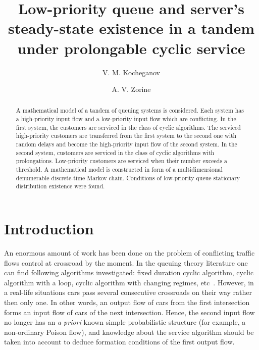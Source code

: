 \documentclass[60x84/16,10pt]{dccn}
\begin{document}
{


\title{Low-priority queue and server's steady-state existence in a tandem under prolongable cyclic service}

\author[1,2]{V. M. Kocheganov}
\author[1]{A. V. Zorine}

\address[1]{Department of Applied Probability Theory\\ N.~I.~Lobachevsky State University of Nizhni Novgorod\\ Gagarina av. 23, 603950 Nizhny Novgorod, Russia}
\address[2]{Department of Applied Probability Theory\\ N.~I.~Lobachevsky State University of Nizhni Novgorod\\ Gagarina av. 23, 603950 Nizhny Novgorod, Russia}

\begin{abstract}
A mathematical model of a tandem of queuing systems is considered. Each system has a high-priority input flow and a low-priority input flow which are conflicting. In the first system, the customers are serviced in the class of cyclic algorithms. The serviced high-priority customers are transferred from the first system to the second one  with random delays and become the high-priority input flow of the second system. In the second system, customers are serviced in the class of cyclic algorithms with prolongations. Low-priority customers are serviced when their number exceeds a threshold. A mathematical model is constructed in form of a multidimensional denumerable discrete-time Markov chain. Conditions of low-priority queue stationary distribution existence were found.
\end{abstract}





\maketitle 


\section{Introduction}
An enormous amount of work has been done on the problem of conflicting traffic flows control at crossroad by the moment. In the queuing theory literature one can find following algorithms investigated: fixed duration cyclic algorithm, cyclic algorithm with a loop, cyclic algorithm with changing regimes, etc~\cite{n:f:p:1968,f:1977,f:1977-1,l:f:2000,p:f:2008,a:b:2010}. However, in a real-life situations cars pass several consecutive crossroads on their way rather then only one. In other words, an output flow of cars from
the first intersection forms an input flow of cars of the next intersection. Hence, the second input flow
no longer has an \textit{a priori} known simple probabilistic structure (for example, a
non-ordinary Poison flow), and knowledge about the service algorithm should be taken into account to deduce formation conditions of the first output flow.

}
\end{document}
